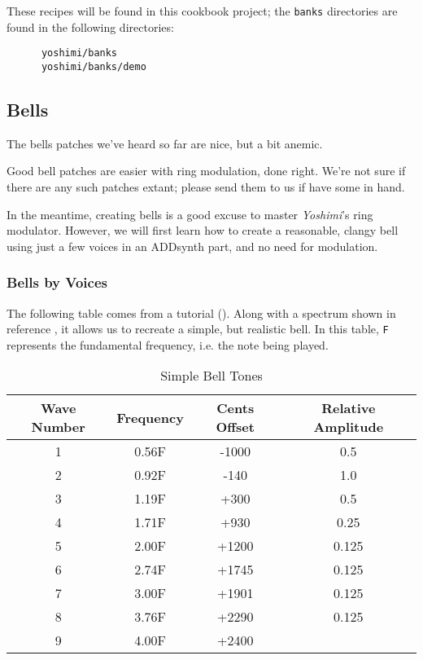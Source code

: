   These recipes will be found in this cookbook project;
   the \texttt{banks} directories are found
   in the following directories:

   \begin{verbatim}
      yoshimi/banks
      yoshimi/banks/demo
   \end{verbatim}

\subsection{Bells}
\label{subsec:cookbook_instruments_bells}

   The bells patches we've heard so far are nice, but a bit anemic.
   
   Good bell patches are easier with ring modulation, done right.  We're not
   sure if there are any such patches extant; please send them to us if
   have some in hand.

   In the meantime, creating bells is a good excuse to master
   \textsl{Yoshimi}'s ring modulator.
   However, we will first learn how to create a reasonable, clangy bell
   using just a few voices in an ADDsynth part, and no need for modulation.

\subsubsection{Bells by Voices}
\label{subsec:cookbook_instruments_bells_by_voices}

   The following table comes from a tutorial (\cite{bellsimple}).  Along
   with a spectrum shown in reference \cite{bellspectrum}, it allows us to
   recreate a simple, but realistic bell.
   In this table, \texttt{F} represents the fundamental frequency, i.e. the
   note being played.

\label{table:simple_bell_tones}
\begin{longtable}{c c c c}
   \caption{Simple Bell Tones} \\
   \hline
      \textbf{Wave Number} &
      \textbf{Frequency} &
      \textbf{Cents Offset} &
      \textbf{Relative Amplitude} \\
   \hline
   \endfirsthead

   1 &  0.56F &  -1000 &   0.5   \\
   2 &  0.92F &  -140  &   1.0   \\
   3 &  1.19F &  +300  &   0.5   \\
   4 &  1.71F &  +930  &   0.25  \\
   5 &  2.00F &  +1200 &   0.125 \\
   6 &  2.74F &  +1745 &   0.125 \\
   7 &  3.00F &  +1901 &   0.125 \\
   8 &  3.76F &  +2290 &   0.125 \\
   9 &  4.00F &  +2400 &         \\
\end{longtable}

